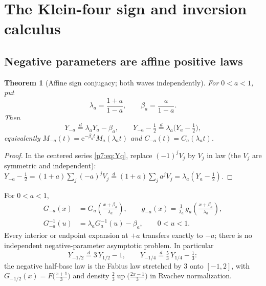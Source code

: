 \documentclass[11pt,oneside]{article}
\numberwithin{equation}{section}
\newtheorem{theorem}{Theorem}[section]
\theoremstyle{definition}
\theoremstyle{remark}
\newcommand{\Up}{\operatorname{up}}
\newcommand{\e}{\mathrm e}
\begin{document}
\section{The Klein-four sign and inversion calculus}
\label{p7:sec:klein-four}

\subsection{Negative parameters are affine positive laws}

\begin{theorem}[Affine sign conjugacy; both waves independently]
\label{p7:thm:sign-conjugacy}
For $0<a<1$, put
\[
 \lambda_a=\frac{1+a}{1-a},\qquad\beta_a=\frac a{1-a}.
\]
Then
\begin{equation}\label{p7:eq:sign-law}
 \boxed{\,Y_{-a}\overset d=\lambda_aY_a-\beta_a,\qquad
 Y_{-a}-\tfrac12\overset d=\lambda_a\bigl(Y_a-\tfrac12\bigr),\,}
\end{equation}
equivalently $M_{-a}(t)=\e^{-\beta_at}M_a(\lambda_at)$ and
$C_{-a}(t)=C_a(\lambda_at)$.
\end{theorem}

\begin{proof}
In the centered series \eqref{p7:eq:Yq}, replace $(-1)^jV_j$ by $V_j$ in law
(the $V_j$ are symmetric and independent):
$Y_{-a}-\tfrac12=(1+a)\sum_j(-a)^jV_j
\overset d=(1+a)\sum_ja^jV_j=\lambda_a(Y_a-\tfrac12)$.
\end{proof}

\begin{corollary}\label{p7:cor:transport}
For $0<a<1$,
\begin{align}
 G_{-a}(x)&=G_a\!\left(\frac{x+\beta_a}{\lambda_a}\right),
 \qquad
 g_{-a}(x)=\frac1{\lambda_a}\,
 g_a\!\left(\frac{x+\beta_a}{\lambda_a}\right),
 \label{p7:eq:cdf-transport}\\
 G_{-a}^{-1}(u)&=\lambda_aG_a^{-1}(u)-\beta_a,
 \qquad 0<u<1.
 \label{p7:eq:quantile-transport}
\end{align}
Every interior or endpoint expansion at $+a$ transfers exactly to $-a$; there
is no independent negative-parameter asymptotic problem.  In particular
\begin{equation}\label{p7:eq:negative-special}
 Y_{-1/2}\overset d=3\,Y_{1/2}-1,
 \qquad
 Y_{-1/4}\overset d=\tfrac53\,Y_{1/4}-\tfrac13:
\end{equation}
the negative half-base law is the Fabius law stretched by $3$ onto $[-1,2]$,
with $G_{-1/2}(x)=F\bigl(\tfrac{x+1}3\bigr)$ and density
$\tfrac23\Up\bigl(\tfrac{2x-1}3\bigr)$ in Rvachev normalization.
\end{corollary}
\end{document}

